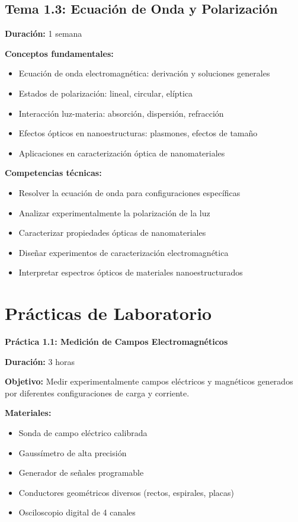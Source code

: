 \begin{tecnologiabox}
\begin{tecnologiabox}
\begin{tecnologiabox}
\begin{teknologiabox}
\subsection{Tema 1.3: Ecuación de Onda y Polarización}
\textbf{Duración:} 1 semana

\begin{saberbox}
\textbf{Conceptos fundamentales:}
\begin{itemize}
\item Ecuación de onda electromagnética: derivación y soluciones generales
\item Estados de polarización: lineal, circular, elíptica
\item Interacción luz-materia: absorción, dispersión, refracción
\item Efectos ópticos en nanoestructuras: plasmones, efectos de tamaño
\item Aplicaciones en caracterización óptica de nanomateriales
\end{itemize}
\end{saberbox}

\begin{saberhacerbox}
\textbf{Competencias técnicas:}
\begin{itemize}
\item Resolver la ecuación de onda para configuraciones específicas
\item Analizar experimentalmente la polarización de la luz
\item Caracterizar propiedades ópticas de nanomateriales
\item Diseñar experimentos de caracterización electromagnética
\item Interpretar espectros ópticos de materiales nanoestructurados
\end{itemize}
\end{saberhacerbox}

\section{Prácticas de Laboratorio}

\begin{practicabox}
\textbf{Práctica 1.1: Medición de Campos Electromagnéticos}

\textbf{Duración:} 3 horas

\textbf{Objetivo:} Medir experimentalmente campos eléctricos y magnéticos generados por diferentes configuraciones de carga y corriente.

\textbf{Materiales:}
\begin{itemize}
\item Sonda de campo eléctrico calibrada
\item Gaussímetro de alta precisión
\item Generador de señales programable
\item Conductores geométricos diversos (rectos, espirales, placas)
\item Osciloscopio digital de 4 canales
\end{itemize}


\end{practicabox}
\end{teknologiabox}
\end{tecnologiabox}
\end{tecnologiabox}
\end{tecnologiabox}
